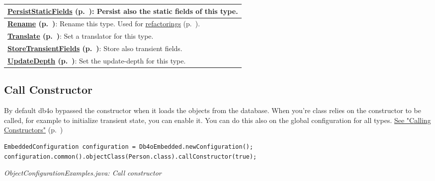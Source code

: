 {\begin{longtable}{|p{}|}
\textbf{\hyperref[ref:configuration-objectclass-persist-static-fields]{PersistStaticFields} (p.~\pageref{ref:configuration-objectclass-persist-static-fields})}: Persist also the static fields of this type. \\ \hline
\textbf{\hyperref[ref:configuration-objectclass-rename-class]{Rename} (p.~\pageref{ref:configuration-objectclass-rename-class})}: Rename this type. Used for \hyperref[ref:advanced-topics-refactoring-and-schema-evolution]{refactorings} (p.~\pageref{ref:advanced-topics-refactoring-and-schema-evolution}). \\ \hline
\textbf{\hyperref[ref:configuration-objectclass-set-a-translator]{Translate} (p.~\pageref{ref:configuration-objectclass-set-a-translator})}: Set a translator for this type. \\ \hline
\textbf{\hyperref[ref:configuration-objectclass-store-transient-fields]{StoreTransientFields} (p.~\pageref{ref:configuration-objectclass-store-transient-fields})}: Store also transient fields. \\ \hline
\textbf{\hyperref[ref:configuration-objectclass-update-depth]{UpdateDepth} (p.~\pageref{ref:configuration-objectclass-update-depth})}: Set the update-depth for this type. \\ \hline
\end{longtable}}

\subsection{Call Constructor}
\label{ref:configuration-objectclass-call-constructor}

By default db4o bypassed the constructor when it loads the objects from the database. When you're class relies on the constructor to be called, for example to initialize transient state, you can enable it. You can do this also on the global configuration for all types. \hyperref[ref:configuration-common-calling-constructors]{See "Calling Constructors"} (p.~\pageref{ref:configuration-common-calling-constructors})

\begin{lstlisting}
EmbeddedConfiguration configuration = Db4oEmbedded.newConfiguration();
configuration.common().objectClass(Person.class).callConstructor(true);
\end{lstlisting}

{\small\itshape ObjectConfigurationExamples.java: Call constructor\par}
\medskip

